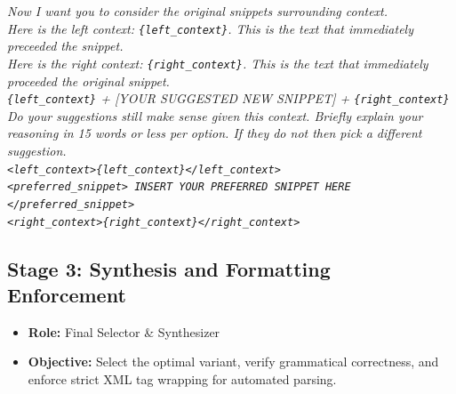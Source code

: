 \documentclass[12pt, a4paper]{article}
\begin{document}
\begin{mdframed}[backgroundcolor=gray!5, linecolor=gray!40, linewidth=0.5pt, innertopmargin=8pt, innerbottommargin=8pt]
\small\itshape
Now I want you to consider the original snippets surrounding context. \\[0.5em]
Here is the left context: \texttt{\{left\_context\}}. This is the text that immediately preceeded the snippet. \\[0.5em]
Here is the right context: \texttt{\{right\_context\}}. This is the text that immediately proceeded the original snippet. \\[0.5em]
\texttt{\{left\_context\}} + [YOUR SUGGESTED NEW SNIPPET] + \texttt{\{right\_context\}} \\[0.5em]
Do your suggestions still make sense given this context. Briefly explain your reasoning in 15 words or less per option. If they do not then pick a different suggestion. \\[0.5em]
\texttt{<left\_context>\{left\_context\}</left\_context>} \\
\texttt{<preferred\_snippet> INSERT YOUR PREFERRED SNIPPET HERE </preferred\_snippet>} \\
\texttt{<right\_context>\{right\_context\}</right\_context>}
\end{mdframed}

\subsection{Stage 3: Synthesis and Formatting Enforcement}
\begin{itemize}[leftmargin=*, noitemsep]
    \item \textbf{Role:} Final Selector \& Synthesizer
    \item \textbf{Objective:} Select the optimal variant, verify grammatical correctness, and enforce strict XML tag wrapping for automated parsing.
\end{itemize}
\end{document}
